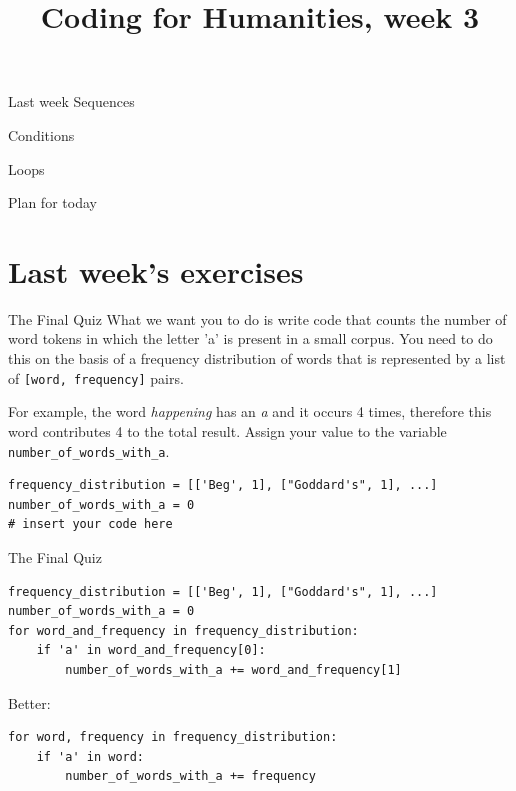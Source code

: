\documentclass[aspectratio=169,usenames,dvipsnames]{beamer}
\title{Coding for Humanities, week 3}
\begin{document}
\begin{frame}
 \titlepage
\end{frame}

\begin{frame}{Last week}
    Sequences

    Conditions

    Loops
\end{frame}

\begin{frame}{Plan for today}
 \tableofcontents
\end{frame}

\section{Last week's exercises}
\begin{frame}[fragile]{The Final Quiz}
What we want you to do is write code that counts the number of word tokens in
which the letter 'a' is present in a small corpus. You need to do this on the
basis of a frequency distribution of words that is represented by a list of
\texttt{[word, frequency]} pairs.

For example, the word \emph{happening} has an \emph{a} and it occurs
4 times, therefore this word contributes 4 to the total result.
Assign your value to the variable \texttt{number\_of\_words\_with\_a}.

\begin{lstlisting}
frequency_distribution = [['Beg', 1], ["Goddard's", 1], ...]
number_of_words_with_a = 0
# insert your code here
\end{lstlisting}
\end{frame}

\begin{frame}[fragile]{The Final Quiz}
\begin{lstlisting}
frequency_distribution = [['Beg', 1], ["Goddard's", 1], ...]
number_of_words_with_a = 0
for word_and_frequency in frequency_distribution:
    if 'a' in word_and_frequency[0]:
        number_of_words_with_a += word_and_frequency[1]
\end{lstlisting}

\pause
Better:
\begin{lstlisting}
for word, frequency in frequency_distribution:
    if 'a' in word:
        number_of_words_with_a += frequency
\end{lstlisting}
\end{frame}
\end{document}
